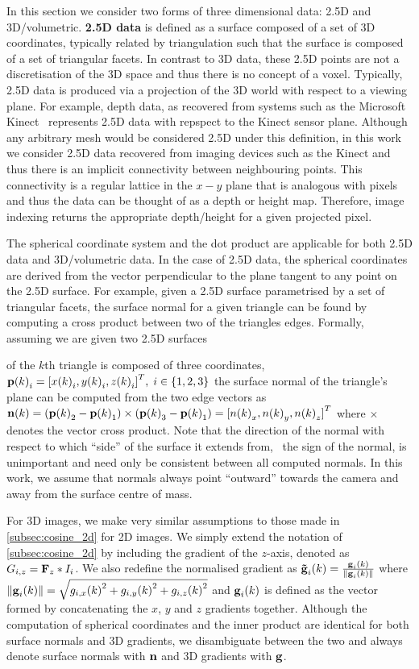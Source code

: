 In this section we consider two forms of three dimensional
data: 2.5D and 3D/volumetric. \textbf{2.5D data} is defined as a surface composed
of a set of 3D coordinates, typically related by triangulation such that 
the surface is composed of a set of triangular facets. In contrast to 3D data,
these 2.5D points are not a discretisation of the 3D space and thus there
is no concept of a voxel. Typically, 2.5D data is produced via a projection
of the 3D world with respect to a viewing plane. For example, depth data, as
recovered from systems such as the Microsoft Kinect~\cite{zhang2012microsoft}
represents 2.5D data with repspect to the Kinect sensor plane. Although any
arbitrary mesh would be considered 2.5D under this definition, in this work
we consider 2.5D data recovered from imaging devices such as the Kinect and thus
there is an implicit connectivity between neighbouring points. This connectivity
is a regular lattice in the $x-y$ plane that is analogous with pixels and thus
the data can be thought of as a depth or height map. Therefore, image indexing 
returns the appropriate depth/height for a given projected pixel. 


The spherical coordinate system and the dot product are applicable for
both 2.5D data and 3D/volumetric data. In the case of 2.5D data, the spherical
coordinates are derived from the vector perpendicular to the plane tangent
to any point on the 2.5D surface. For example, given a 2.5D surface parametrised
by a set of triangular facets, the surface normal for a given triangle
can be found by computing a cross product between two of the triangles edges.
Formally, assuming we are given two 2.5D surfaces 


of the $k$th triangle is composed of three coordinates, 
${\boldsymbol{\mathbf{p}}(k)}_i = {[{x(k)}_i, {y(k)}_i, {z(k)}_i]}^T, \; i \in \{1, 2, 3\}$
the surface normal of the triangle's plane can be computed from the two edge vectors as
$\boldsymbol{\mathbf{n}}(k) = ({\boldsymbol{\mathbf{p}}(k)}_2 - {\boldsymbol{\mathbf{p}}(k)}_1) \times ({\boldsymbol{\mathbf{p}}(k)}_3 - {\boldsymbol{\mathbf{p}}(k)}_1) = {[{n(k)}_x, {n(k)}_y, {n(k)}_z]}^T$ 
where $\times$ denotes the vector cross product. Note that the direction of the 
normal with respect to which ``side'' of the surface it extends from,
\eg~the sign of the normal, is unimportant and need only be consistent between
all computed normals. In this work, we assume that normals always point 
``outward'' towards the camera and away from the surface centre of mass.

For 3D images, we make very similar
assumptions to those made in \cref{subsec:cosine_2d} for 2D images. 
We simply extend the notation of \cref{subsec:cosine_2d} by including the 
gradient of the $z$-axis, denoted as $G_{i,z} = \boldsymbol{\mathbf{F}}_z \ast I_i$.
We also redefine the normalised gradient as
$\boldsymbol{\mathbf{\tilde{g}}}_{i}(k) = \frac{\boldsymbol{\mathbf{g}}_{i}(k)}{\lVert{} \boldsymbol{\mathbf{g}}_{i}(k) \rVert}$
where $\lVert{} \boldsymbol{\mathbf{g}}_{i}(k) \rVert = \sqrt{{g_{i,x}(k)}^2 + {g_{i,y}(k)}^2 +
{g_{i,z}(k)}^2}$ and $\boldsymbol{\mathbf{g}}_{i}(k)$ is defined as the vector formed by
concatenating the $x$, $y$ and $z$ gradients together. Although the
computation of spherical coordinates and the inner product are identical for
both surface normals and 3D gradients, we disambiguate between the two and
always denote surface normals with $\boldsymbol{\mathbf{n}}$ and 3D gradients with $\boldsymbol{\mathbf{g}}$. 

